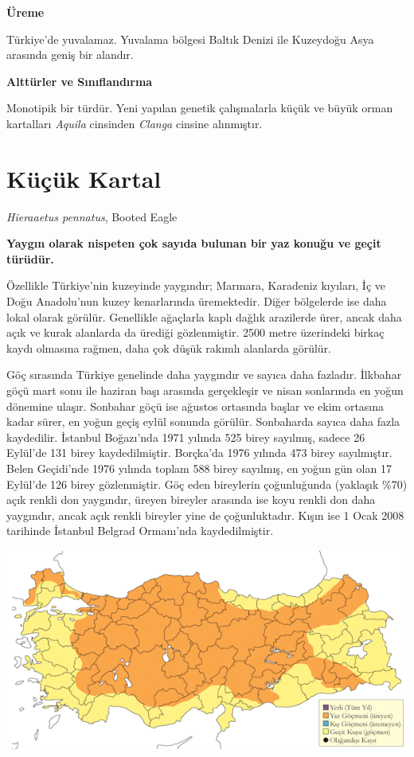 \documentclass[
  a4paper,
  DIV=11,
  numbers=noendperiod]{scrreprt}
\begin{document}
\textbf{Üreme}

Türkiye'de yuvalamaz. Yuvalama bölgesi Baltık Denizi ile Kuzeydoğu Asya
arasında geniş bir alandır.

\textbf{Alttürler ve Sınıflandırma}

Monotipik bir türdür. Yeni yapılan genetik çalışmalarla küçük ve büyük
orman kartalları \emph{Aquila} cinsinden \emph{Clanga} cinsine
alınmıştır.

\section{Küçük Kartal}\label{kuxfcuxe7uxfck-kartal}

\emph{Hieraaetus pennatus}, Booted Eagle

\textbf{Yaygın olarak nispeten çok sayıda bulunan bir yaz konuğu ve
geçit türüdür.}

Özellikle Türkiye'nin kuzeyinde yaygındır; Marmara, Karadeniz kıyıları,
İç ve Doğu Anadolu'nun kuzey kenarlarında üremektedir. Diğer bölgelerde
ise daha lokal olarak görülür. Genellikle ağaçlarla kaplı dağlık
arazilerde ürer, ancak daha açık ve kurak alanlarda da ürediği
gözlenmiştir. 2500 metre üzerindeki birkaç kaydı olmasına rağmen, daha
çok düşük rakımlı alanlarda görülür.

Göç sırasında Türkiye genelinde daha yaygındır ve sayıca daha fazladır.
İlkbahar göçü mart sonu ile haziran başı arasında gerçekleşir ve nisan
sonlarında en yoğun dönemine ulaşır. Sonbahar göçü ise ağustos ortasında
başlar ve ekim ortasına kadar sürer, en yoğun geçiş eylül sonunda
görülür. Sonbaharda sayıca daha fazla kaydedilir. İstanbul Boğazı'nda
1971 yılında 525 birey sayılmış, sadece 26 Eylül'de 131 birey
kaydedilmiştir. Borçka'da 1976 yılında 473 birey sayılmıştır. Belen
Geçidi'nde 1976 yılında toplam 588 birey sayılmış, en yoğun gün olan 17
Eylül'de 126 birey gözlenmiştir. Göç eden bireylerin çoğunluğunda
(yaklaşık \%70) açık renkli don yaygındır, üreyen bireyler arasında ise
koyu renkli don daha yaygındır, ancak açık renkli bireyler yine de
çoğunluktadır. Kışın ise 1 Ocak 2008 tarihinde İstanbul Belgrad
Ormanı'nda kaydedilmiştir.

\includegraphics{images/harita_Page_093.png}
\end{document}
